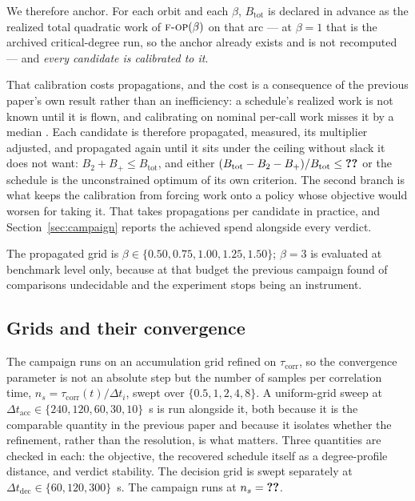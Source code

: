 We therefore anchor. For each orbit and each $\beta$, $B_{\mathrm{tot}}$ is
declared in advance as the realized total quadratic work of $\Fop(\beta)$ on
that arc --- at $\beta=1$ that is the archived critical-degree run, so the
anchor already exists and is not recomputed --- and \emph{every candidate is
calibrated to it}.

That calibration costs propagations, and the cost is a consequence of the
previous paper's own result rather than an inefficiency: a schedule's realized
work is not known until it is flown, and calibrating on nominal per-call work
misses it by a median . Each candidate is therefore propagated,
measured, its multiplier adjusted, and propagated again until it sits under
the ceiling without slack it does not want:
$B_2+B_+\le B_{\mathrm{tot}}$, and either
$(B_{\mathrm{tot}}-B_2-B_+)/B_{\mathrm{tot}}\le\ph{pct}$ or the schedule is
the unconstrained optimum of its own criterion. The second branch is what
keeps the calibration from forcing work onto a policy whose objective would
worsen for taking it. That takes  propagations per candidate in
practice, and Section~\ref{sec:campaign} reports the achieved spend alongside
every verdict.

The propagated grid is $\beta\in\{0.50,0.75,1.00,1.25,1.50\}$;
$\beta=3$ is evaluated at benchmark level only, because at that budget the
previous campaign found  of  comparisons undecidable and the
experiment stops being an instrument.

\subsection{Grids and their convergence}
\label{sec:setup-grids}

 The campaign runs on an accumulation grid
refined on $\tau_{\mathrm{corr}}$, so the convergence parameter is not an
absolute step but the number of samples per correlation time,
$n_s=\tau_{\mathrm{corr}}(t)/\Delta t_i$, swept over
$\{0.5,1,2,4,8\}$. A uniform-grid sweep at
$\Delta t_{\mathrm{acc}}\in\{240,120,60,30,10\}$~s is run alongside it, both
because it is the comparable quantity in the previous paper and because it
isolates whether the refinement, rather than the resolution, is what matters.
Three quantities are checked in each: the objective, the recovered schedule
itself as a degree-profile distance, and verdict stability. The decision grid
is swept separately at $\Delta t_{\mathrm{dec}}\in\{60,120,300\}$~s. The
campaign runs at $n_s=\ph{value}$. 

